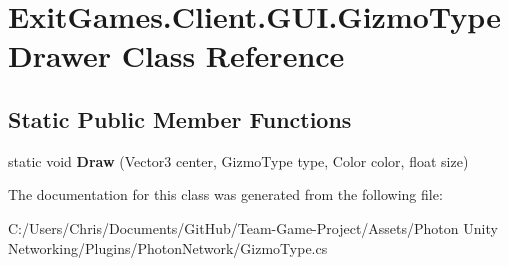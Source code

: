 \hypertarget{class_exit_games_1_1_client_1_1_g_u_i_1_1_gizmo_type_drawer}{}\section{Exit\+Games.\+Client.\+G\+U\+I.\+Gizmo\+Type\+Drawer Class Reference}
\label{class_exit_games_1_1_client_1_1_g_u_i_1_1_gizmo_type_drawer}
\subsection*{Static Public Member Functions}
\begin{DoxyCompactItemize}
\item 
static void {\bfseries Draw} (Vector3 center, Gizmo\+Type type, Color color, float size)\hypertarget{class_exit_games_1_1_client_1_1_g_u_i_1_1_gizmo_type_drawer_a9a9c702995c512168fae27aefc07f666}{}\label{class_exit_games_1_1_client_1_1_g_u_i_1_1_gizmo_type_drawer_a9a9c702995c512168fae27aefc07f666}

\end{DoxyCompactItemize}


The documentation for this class was generated from the following file\+:\begin{DoxyCompactItemize}
\item 
C\+:/\+Users/\+Chris/\+Documents/\+Git\+Hub/\+Team-\/\+Game-\/\+Project/\+Assets/\+Photon Unity Networking/\+Plugins/\+Photon\+Network/Gizmo\+Type.\+cs\end{DoxyCompactItemize}
